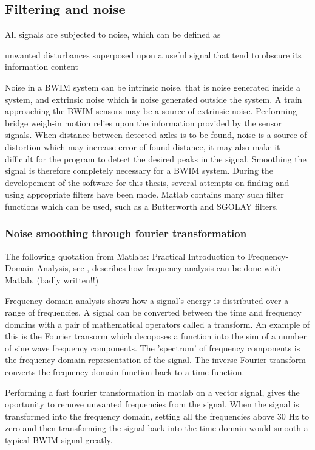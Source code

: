 \subsection{Filtering and noise}
All signals are subjected to noise, which can be defined as
\begin{displayquote}
	unwanted disturbances superposed upon a useful signal that tend to obscure its information content \cite{IEEE_electronics}
\end{displayquote}
Noise in a BWIM system can be intrinsic noise, that is noise generated inside a system, and extrinsic noise which is noise generated outside the system. A train approaching the BWIM sensors may be a source of extrinsic noise.
Performing bridge weigh-in motion relies upon the information provided by the sensor signals. When distance between detected axles is to be found, noise is a source of distortion which may increase error of found distance, it may also make it difficult for the program to detect the desired peaks in the signal. Smoothing the signal is therefore completely necessary for a BWIM system. During the developement of the software for this thesis, several attempts on finding and using appropriate filters have been made. Matlab contains many such filter functions which can be used, such as a Butterworth and SGOLAY filters.
\subsubsection{Noise smoothing through fourier transformation}
The following quotation from  Matlabs: Practical Introduction to Frequency-Domain Analysis, see \cite{frequency_domain_analysis}, describes how frequency analysis can be done with Matlab. (badly written!!)
\begin{displayquote}
	Frequency-domain analysis shows how a signal's energy is distributed over a range of frequencies. A signal can be converted between the time and frequency domains with a pair of mathematical operators called a transform. An example of this is the Fourier transorm which decoposes a function into the sim of a number of sine wave frequency components. The 'spectrum' of frequency components is the frequency domain representation of the signal. The inverse Fourier transform converts the frequency domain function back to a time function.
\end{displayquote}

Performing a fast fourier transformation in matlab on a vector signal, gives the oportunity to remove unwanted frequencies from the signal. When the signal is transformed into the frequency domain, setting all the frequencies above 30 Hz to zero and then transforming the signal back into the time domain would smooth a typical BWIM signal greatly.
